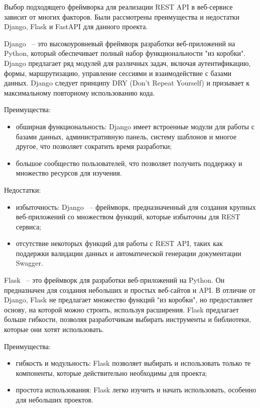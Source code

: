 Выбор подходящего фреймворка для реализации REST API в веб-сервисе зависит от многих факторов. Были рассмотрены преимущества и недостатки Django, Flask и FastAPI для данного проекта.

Django ~-- это высокоуровневый фреймворк разработки веб-приложений на Python, который обеспечивает полный набор функциональности "из коробки". Django предлагает ряд модулей для различных задач, включая аутентификацию, формы, маршрутизацию, управление сессиями и взаимодействие с базами данных. Django следует принципу DRY (Don't Repeat Yourself) и призывает к максимальному повторному использованию кода.

Преимущества:
\begin{itemize}
    \item обширная функциональность: Django имеет встроенные модули для работы с базами данных, административную панель, систему шаблонов и многое другое, что позволяет сократить время разработки;
    \item большое сообщество пользователей, что позволяет получить поддержку и множество ресурсов для изучения.
\end{itemize}

Недостатки:
\begin{itemize}
    \item избыточность: Django ~-- фреймворк, предназначенный для создания крупных веб-приложений со множеством функций, которые избыточны для REST сервиса;
    \item отсутствие некоторых функций для работы с REST API, таких как поддержки валидации данных и автоматической генерации документации Swagger.
\end{itemize}

Flask ~-- это фреймворк для разработки веб-приложений на Python. Он предназначен для создания небольших и простых веб-сайтов и API. В отличие от Django, Flask не предлагает множество функций "из коробки", но предоставляет основу, на которой можно строить, используя расширения. Flask предлагает больше гибкости, позволяя разработчикам выбирать инструменты и библиотеки, которые они хотят использовать.

Преимущества:
\begin{itemize}
    \item гибкость и модульность: Flask позволяет выбирать и использовать только те компоненты, которые действительно необходимы для проекта;
    \item простота использования: Flask легко изучить и начать использовать, особенно для небольших проектов.
\end{itemize}

